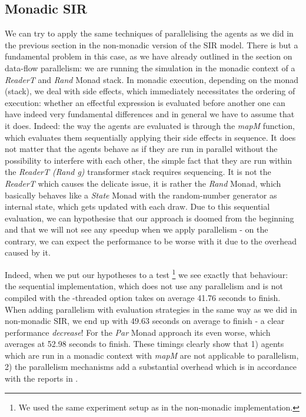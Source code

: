 \subsection{Monadic SIR}
We can try to apply the same techniques of parallelising the agents as we did in the previous section in the non-monadic version of the SIR model. There is but a fundamental problem in this case, as we have already outlined in the section on data-flow parallelism: we are running the simulation in the monadic context of a \textit{ReaderT} and \textit{Rand} Monad stack. In monadic execution, depending on the monad (stack), we deal with side effects, which immediately necessitates the ordering of execution: whether an effectful expression is evaluated before another one can have indeed very fundamental differences and in general we have to assume that it does.
Indeed: the way the agents are evaluated is through the \textit{mapM} function, which evaluates them sequentially applying their side effects in sequence. It does not matter that the agents behave as if they are run in parallel without the possibility to interfere with each other, the simple fact that they are run within the \textit{ReaderT (Rand g)} transformer stack requires sequencing. It is not the \textit{ReaderT} which causes the delicate issue, it is rather the \textit{Rand} Monad, which basically behaves like a \textit{State} Monad with the random-number generator as internal state, which gets updated with each draw.
Due to this sequential evaluation, we can hypothesise that our approach is doomed from the beginning and that we will not see any speedup  when we apply parallelism - on the contrary, we can expect the performance to be worse with it due to the overhead caused by it.

Indeed, when we put our hypotheses to a test \footnote{We used the same experiment setup as in the non-monadic implementation.} we see exactly that behaviour: the sequential implementation, which does not use any parallelism and is not compiled with the -threaded option takes on average 41.76 seconds to finish. When adding parallelism with evaluation strategies in the same way as we did in non-monadic SIR, we end up with 49.63 seconds on average to finish - a clear performance \textit{decrease}! For the \textit{Par} Monad approach its even worse, which averages at 52.98 seconds to finish. These timings clearly show that 1) agents which are run in a monadic context with \textit{mapM} are not applicable to parallelism, 2) the parallelism mechanisms add a substantial overhead which is in accordance with the reports in \cite{marlow_parallel_2013}.


